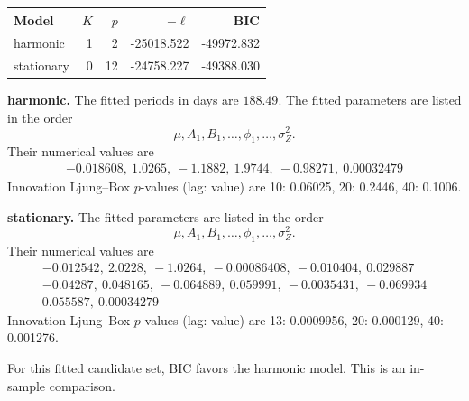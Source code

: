\begin{center}\begin{tabular}{lrrrr}
Model & $K$ & $p$ & $-\ell$ & BIC\\\hline
harmonic & 1 & 2 & -25018.522 & -49972.832\\
stationary & 0 & 12 & -24758.227 & -49388.030\\
\end{tabular}\end{center}
\noindent\textbf{harmonic.} 
The fitted periods in days are $188.49$. 
The fitted parameters are listed in the order
\[\mu,A_1,B_1,\ldots,\phi_1,\ldots,\sigma_Z^2.\]
Their numerical values are
\[\begin{gathered}-0.018608,\ 1.0265,\ -1.1882,\ 1.9744,\ -0.98271,\ 0.00032479\end{gathered}\]
Innovation Ljung--Box $p$-values (lag: value) are 10: 0.06025, 20: 0.2446, 40: 0.1006.\par
\noindent\textbf{stationary.} 
The fitted parameters are listed in the order
\[\mu,A_1,B_1,\ldots,\phi_1,\ldots,\sigma_Z^2.\]
Their numerical values are
\[\begin{gathered}-0.012542,\ 2.0228,\ -1.0264,\ -0.00086408,\ -0.010404,\ 0.029887\\-0.04287,\ 0.048165,\ -0.064889,\ 0.059991,\ -0.0035431,\ -0.069934\\0.055587,\ 0.00034279\end{gathered}\]
Innovation Ljung--Box $p$-values (lag: value) are 13: 0.0009956, 20: 0.000129, 40: 0.001276.\par
For this fitted candidate set, BIC favors the harmonic model. This is an in-sample comparison.\par